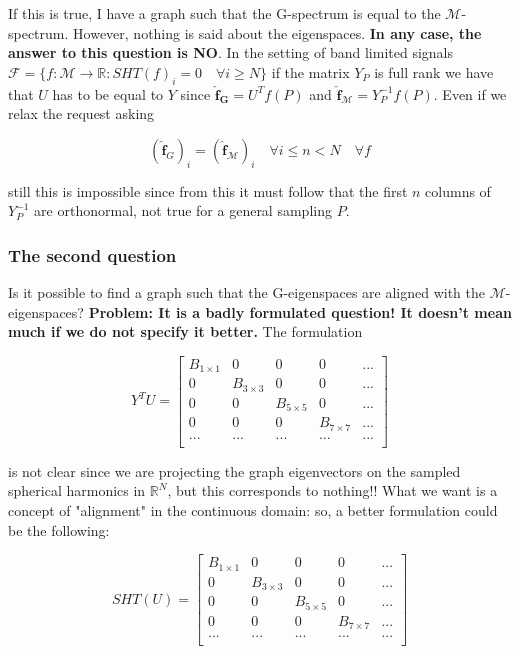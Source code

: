 If this is true, I have a graph such that the G-spectrum is equal to the $\mathcal M$-spectrum. However, nothing is said about the eigenspaces. \textbf{In any case, the answer to this question is NO}. 
In the setting of band limited signals $\mathcal F = \{f: \mathcal M \rightarrow \mathbb R: SHT(f)_i = 0\quad \forall i \geq N \}$  if the matrix $Y_P$ is full rank we have that $U$ has to be equal to $Y$ since $\mathbf{\hat f_G} = U^Tf(P)$ and $\mathbf{\hat f_\mathcal M} = Y_P^{-1}f(P)$. Even if we relax the request asking
 
$$(\mathbf{\hat f}_{G})_i = (\mathbf{\hat f}_{\mathcal M})_i \quad\forall i \leq n<N \quad \forall f$$

still this is impossible since from this it must follow that the first $n$ columns of $Y^{-1}_P$ are orthonormal, not true for a general sampling $P$.


\subsubsection*{The second question}
Is it possible to find a graph such that the G-eigenspaces are aligned with the $\mathcal M$-eigenspaces? \textbf{Problem: It is a badly formulated question! It doesn't mean much if we do not specify it better.} The formulation 

\[Y^TU = 
\left[ {\begin{array}{ccccc}
	B_{1\times 1} & 0 & 0 & 0 & ...\\
	0 & B_{3\times 3} & 0 & 0 & ...\\
	0 & 0 & B_{5\times 5} & 0 & ...\\
	0 & 0 & 0 & B_{7\times 7} & ...\\
	... & ... & ... & ... & ...\\
	\end{array} } \right]
\]

is not clear since we are projecting the graph eigenvectors on the sampled spherical harmonics in $\mathbb R^N$, but this corresponds to nothing!! What we want is a concept of "alignment" in the continuous domain: so, a better formulation could be the following:


\[SHT(U) = 
\left[ {\begin{array}{ccccc}
	B_{1\times 1} & 0 & 0 & 0 & ...\\
	0 & B_{3\times 3} & 0 & 0 & ...\\
	0 & 0 & B_{5\times 5} & 0 & ...\\
	0 & 0 & 0 & B_{7\times 7} & ...\\
	... & ... & ... & ... & ...\\
	\end{array} } \right]
\]

